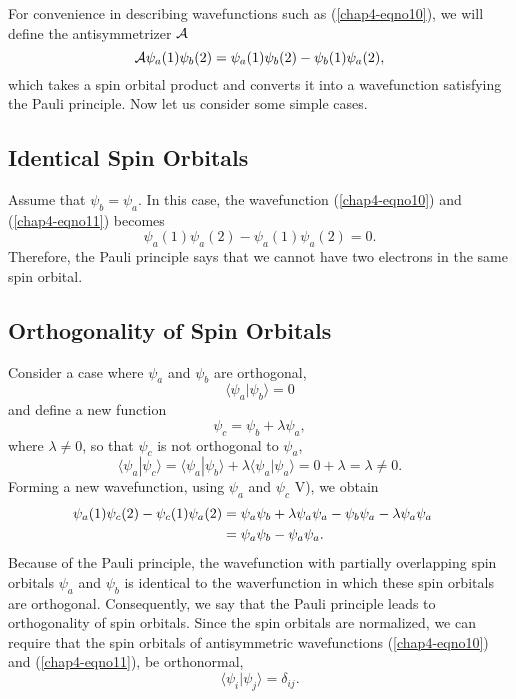 For convenience in describing wavefunctions such as
(\ref{chap4-eqno10}), we will define the antisymmetrizer ${\cal A}$
\begin{equation}
{\cal A} \psi_a (1) \psi_b (2) = \psi_a (1) \psi_b (2) - \psi_b (1) 
\psi_a (2),
\label{chap4-eqno11}
\end{equation}
which takes a spin orbital product and converts it into a wavefunction
satisfying the Pauli principle.  Now let us consider some simple
cases.

\subsection{Identical Spin Orbitals}

Assume that $\psi_b = \psi_a$.  In this case, the wavefunction
(\ref{chap4-eqno10}) and (\ref{chap4-eqno11}) becomes
\begin{equation}
\psi_a (1) \psi_a (2) - \psi_a (1) \psi_a (2) = 0.
\end{equation}
Therefore, the Pauli principle says that we cannot have two electrons in 
the same spin orbital.

\subsection{Orthogonality of Spin Orbitals}

Consider a case where $\psi_a$ and $\psi_b$ are orthogonal,
\begin{equation}
\langle \psi_a | \psi_b \rangle = 0
\end{equation}
and define a new function
\begin{equation}
\psi_c = \psi_b + \lambda \psi_a ,
\end{equation}
where $\lambda \not= 0$, so that $\psi_c$ is not orthogonal to $\psi_a$,
\begin{equation}
\langle \psi_a | \psi_c \rangle = \langle \psi_a | \psi_b \rangle + \lambda 
\langle \psi_a | \psi_a \rangle = 0 + \lambda = \lambda \not= 0 .
\end{equation}
Forming a new wavefunction, using $\psi_a$ and $\psi_c$ V), we obtain
\begin{eqnarray}
\psi_a (1) \psi_c (2) - \psi_c (1) \psi_a (2) &= \psi_a \psi_b + \lambda 
\psi_a \psi_a - \psi_b \psi_a - \lambda \psi_a \psi_a\cr
&= \psi_a \psi_b - \psi_a \psi_a .\cr
\end{eqnarray}
Because of the Pauli principle, the wavefunction with partially
overlapping spin orbitals $\psi_a$ and $\psi_b$ is identical to the
waverfunction in which these spin orbitals are orthogonal.
Consequently, we say that the Pauli principle leads to orthogonality
of spin orbitals.  Since the spin orbitals are normalized, we can
require that the spin orbitals of antisymmetric wavefunctions
(\ref{chap4-eqno10}) and (\ref{chap4-eqno11}), be orthonormal,
\begin{equation}
\langle \psi_i | \psi_j \rangle = \delta_{ij} .
\label{chap4-eqno12}
\end{equation}

